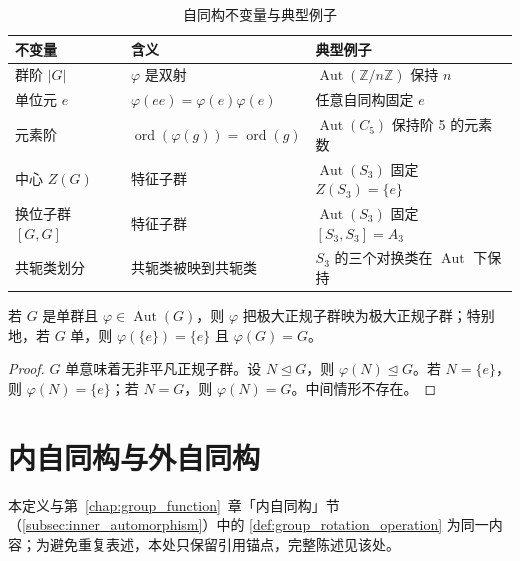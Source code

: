 \begin{table}[htbp]
    \centering
    \caption{自同构不变量与典型例子}
    \label{tab:automorphism_invariants}
    \small
    \renewcommand{\arraystretch}{1.25}
    \begin{tabular}{@{}p{3.4cm} p{5.0cm} p{4.6cm}@{}}
    \toprule
    不变量 & 含义 & 典型例子 \\
    \midrule
    群阶 $|G|$ & $\varphi$ 是双射 & $\operatorname{Aut}(\mathbb{Z}/n\mathbb{Z})$ 保持 $n$ \\
    单位元 $e$ & $\varphi(ee)=\varphi(e)\varphi(e)$ & 任意自同构固定 $e$ \\
    元素阶 & $\operatorname{ord}(\varphi(g))=\operatorname{ord}(g)$ & $\operatorname{Aut}(C_5)$ 保持阶 5 的元素数 \\
    中心 $Z(G)$ & 特征子群 & $\operatorname{Aut}(S_3)$ 固定 $Z(S_3)=\{e\}$ \\
    换位子群 $[G,G]$ & 特征子群 & $\operatorname{Aut}(S_3)$ 固定 $[S_3,S_3]=A_3$ \\
    共轭类划分 & 共轭类被映到共轭类 & $S_3$ 的三个对换类在 $\operatorname{Aut}$ 下保持 \\
    \bottomrule
    \end{tabular}
\end{table}

\begin{corollary}[自同构保素性]\label{cor:automorphism_simple}
若 $G$ 是单群且 $\varphi\in\operatorname{Aut}(G)$，则 $\varphi$ 把极大正规子群映为极大正规子群；特别地，若 $G$ 单，则 $\varphi(\{e\})=\{e\}$ 且 $\varphi(G)=G$。
\end{corollary}

\begin{proof}
$G$ 单意味着无非平凡正规子群。设 $N\trianglelefteq G$，则 $\varphi(N)\trianglelefteq G$。若 $N=\{e\}$，则 $\varphi(N)=\{e\}$；若 $N=G$，则 $\varphi(N)=G$。中间情形不存在。
\end{proof}

\section{内自同构与外自同构}

\begin{definition}[内自同构]\label{def:higher_inner_automorphism}
本定义与第~\ref{chap:group_function}~章「内自同构」节（\cref{subsec:inner_automorphism}）中的 \cref{def:group_rotation_operation} 为同一内容；为避免重复表述，本处只保留引用锚点，完整陈述见该处。
\end{definition}

